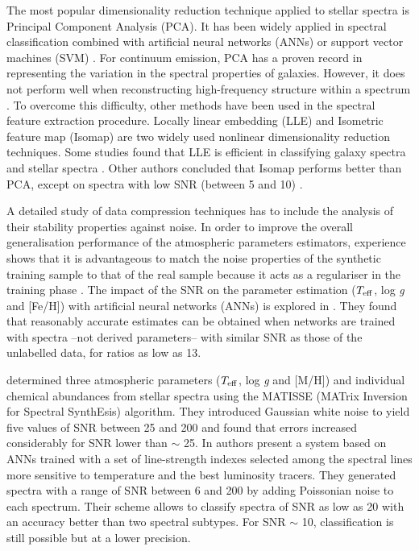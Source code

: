 \documentclass[a4paper,fleqn,usenatbib]{mnras}
\begin{document}
The most popular dimensionality reduction technique applied
to stellar spectra is Principal Component Analysis (PCA). It has
been widely applied in spectral classification combined with
artificial neural networks (ANNs) \citep{singh:98} or support vector
machines (SVM) \citep{fiorentin:08b}. For continuum emission, PCA has a
proven record in representing the variation in the spectral properties
of galaxies. However, it does not perform well when reconstructing
high-frequency structure within a spectrum \citep{vanderplas:09}. To
overcome this difficulty, other methods have been used in the
spectral feature extraction procedure. Locally linear embedding
(LLE) \citep{roweisLLE:00} and Isometric feature map (Isomap) 
\citep{tenenbaum:00} are two widely used nonlinear dimensionality 
reduction techniques. Some studies found that LLE is efficient in 
classifying galaxy spectra \citep{vanderplas:09} and stellar spectra 
\citep{daniel:11}. Other authors concluded that Isomap performs better 
than PCA, except on spectra with low SNR (between 5 and 10) \citep{bu:14}.

A detailed study of data compression techniques has to include
the analysis of their stability properties against noise. In order
to improve the overall generalisation performance of the atmospheric
parameters estimators, experience shows that it is advantageous to
match the noise properties of the synthetic training sample to that of
the real sample because it acts as a regulariser in the training phase
\citep{fiorentin:08a}.  The impact of the SNR on the parameter
estimation ($T_{\rm eff}$, log \textit{g} and [Fe/H]) with artificial
neural networks (ANNs) is explored in \cite{snider:01}. They found
that reasonably accurate estimates can be obtained when networks are
trained with spectra --not derived parameters-- with similar SNR 
as those of the unlabelled data, for ratios as low as 13.


\cite{recio:06} determined three atmospheric parameters
($T_{\rm eff}$, log \textit{g} and [M/H]) and individual chemical
abundances from stellar spectra using the MATISSE (MATrix
Inversion for Spectral SynthEsis) algorithm. They introduced Gaussian
white noise to yield five values of SNR between 25 and 200 and found
that errors increased considerably for SNR lower than $\sim$ 25.  In
\cite{navarro:12} authors present a system based on ANNs trained with
a set of line-strength indexes selected among the spectral lines more
sensitive to temperature and the best luminosity tracers. They
generated spectra with a range of SNR between 6 and 200 by adding
Poissonian noise to each spectrum. Their scheme allows to classify
spectra of SNR as low as 20 with an accuracy better than two spectral
subtypes. For SNR $\sim$ 10, classification is still possible but at a
lower precision.
\end{document}
